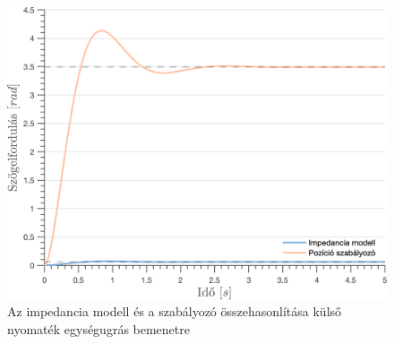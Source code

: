 \begin{figure}[ht]
    \begin{center}
    \includegraphics[width=\textwidth]{images/observer_controller_torque_resp.png}
    \caption{Az impedancia modell és a szabályozó összehasonlítása külső nyomaték egységugrás bemenetre}\label{fig:observer_controller_torque_resp}
    \end{center}
\end{figure}


